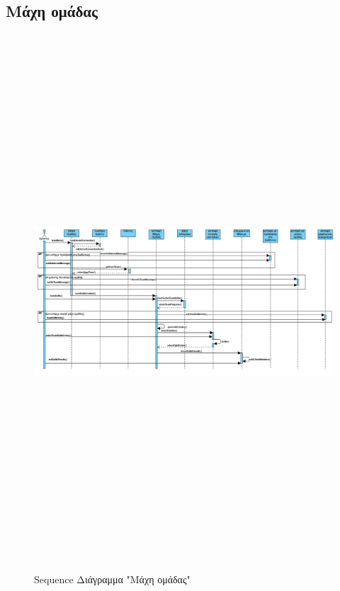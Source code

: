\subsection{Μάχη ομάδας}
\begin{figure}[!htb]
\begin{center}
    \includegraphics[width=19.5cm,height=20cm]{sequence_teambattle.png}
    \caption{Sequence Διάγραμμα "Μάχη ομάδας"}
    \label{}
    \end{center}
\end{figure}
\newpage

